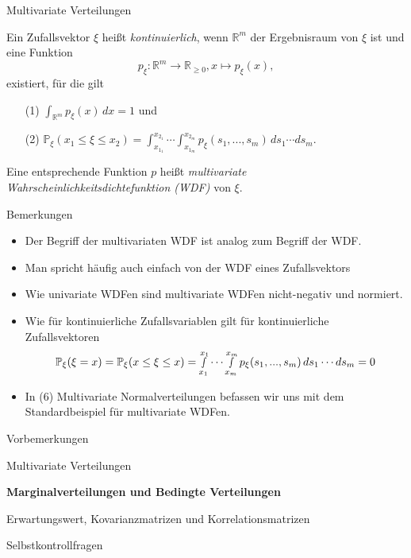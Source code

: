 \documentclass[
  8pt,
  ignorenonframetext,
]{beamer}
\providecommand{\tightlist}{%
  \setlength{\itemsep}{0pt}\setlength{\parskip}{0pt}}
\begin{document}
\begin{frame}{Multivariate Verteilungen}
\protect\hypertarget{multivariate-verteilungen-7}{}
\small
\begin{definition}
\justifying
Ein Zufallsvektor $\xi$ heißt \textit{kontinuierlich}, wenn $\mathbb{R}^m$ der
Ergebnisraum von $\xi$ ist und eine Funktion
\begin{equation}
p_\xi : \mathbb{R}^m \to \mathbb{R}_{\ge 0}, x \mapsto p_\xi(x),
\end{equation}
existiert, für die gilt
\begin{itemize}
\item[(1)] $\int_{\mathbb{R}^m} p_\xi(x)\,dx = 1$ und
\item[(2)] $\mathbb{P}_\xi(x_1 \le \xi \le x_2)
            = \int_{x_{1_1}}^{x_{2_1}} \cdots \int_{x_{1_m}}^{x_{2_m}} p_\xi(s_1,...,s_m)\,ds_1 \cdots ds_m$.
\end{itemize}
Eine entsprechende Funktion $p$ heißt \textit{multivariate Wahrscheinlichkeitsdichtefunktion (WDF)} von $\xi$.
\end{definition}

\footnotesize

Bemerkungen

\begin{itemize}
\tightlist
\item
  Der Begriff der multivariaten WDF ist analog zum Begriff der WDF.
\item
  Man spricht häufig auch einfach von der WDF eines Zufallsvektors
\item
  Wie univariate WDFen sind multivariate WDFen nicht-negativ und
  normiert.
\item
  Wie für kontinuierliche Zufallsvariablen gilt für kontinuierliche
  Zufallsvektoren \begin{equation}
  \mathbb{P}_\xi(\xi = x)
  = \mathbb{P}_\xi(x \le \xi \le x)
  = \smallint_{x_1}^{x_1} \cdots \smallint_{x_m}^{x_m} p_\xi(s_1,...,s_m)\,ds_1 \cdots ds_m
  = 0
  \end{equation}
\item
  In (6) Multivariate Normalverteilungen befassen wir uns mit dem
  Standardbeispiel für multivariate WDFen.
\end{itemize}
\end{frame}

\begin{frame}{}
\protect\hypertarget{section-5}{}
\large
{}
\vfill

Vorbemerkungen

Multivariate Verteilungen

\textbf{Marginalverteilungen und Bedingte Verteilungen}

Erwartungswert, Kovarianzmatrizen und Korrelationsmatrizen

Selbstkontrollfragen \vfill
\end{frame}
\end{document}

